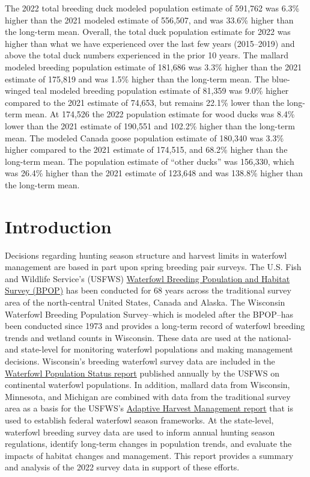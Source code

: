 \documentclass[
  12pt,
]{article}
\begin{document}
The 2022 total breeding duck modeled population estimate of 591,762 was
6.3\% higher than the 2021 modeled estimate of 556,507, and was 33.6\%
higher than the long-term mean. Overall, the total duck population
estimate for 2022 was higher than what we have experienced over the last
few years (2015--2019) and above the total duck numbers experienced in
the prior 10 years. The mallard modeled breeding population estimate of
181,686 was 3.3\% higher than the 2021 estimate of 175,819 and was 1.5\%
higher than the long-term mean. The blue-winged teal modeled breeding
population estimate of 81,359 was 9.0\% higher compared to the 2021
estimate of 74,653, but remains 22.1\% lower than the long-term mean. At
174,526 the 2022 population estimate for wood ducks was 8.4\% lower than
the 2021 estimate of 190,551 and 102.2\% higher than the long-term mean.
The modeled Canada goose population estimate of 180,340 was 3.3\% higher
compared to the 2021 estimate of 174,515, and 68.2\% higher than the
long-term mean. The population estimate of ``other ducks'' was 156,330,
which was 26.4\% higher than the 2021 estimate of 123,648 and was
138.8\% higher than the long-term mean.

\newpage

\hypertarget{introduction}{%
\section{Introduction}\label{introduction}}

Decisions regarding hunting season structure and harvest limits in
waterfowl management are based in part upon spring breeding pair
surveys. The U.S. Fish and Wildlife Service's (USFWS)
\href{https://www.fws.gov/project/waterfowl-breeding-population-and-habitat-survey}{Waterfowl
Breeding Population and Habitat Survey (BPOP)} has been conducted for 68
years across the traditional survey area of the north-central United
States, Canada and Alaska. The Wisconsin Waterfowl Breeding Population
Survey--which is modeled after the BPOP--has been conducted since 1973
and provides a long-term record of waterfowl breeding trends and wetland
counts in Wisconsin. These data are used at the national- and
state-level for monitoring waterfowl populations and making management
decisions. Wisconsin's breeding waterfowl survey data are included in
the
\href{https://www.fws.gov/sites/default/files/documents/WaterfowlPopulationStatusReport21.pdf}{Waterfowl
Population Status report} published annually by the USFWS on continental
waterfowl populations. In addition, mallard data from Wisconsin,
Minnesota, and Michigan are combined with data from the traditional
survey area as a basis for the USFWS's
\href{https://www.fws.gov/sites/default/files/documents/adaptive-harvest-management-hunting-season-report-2022.pdf}{Adaptive
Harvest Management report} that is used to establish federal waterfowl
season frameworks. At the state-level, waterfowl breeding survey data
are used to inform annual hunting season regulations, identify long-term
changes in population trends, and evaluate the impacts of habitat
changes and management. This report provides a summary and analysis of
the 2022 survey data in support of these efforts.
\end{document}
